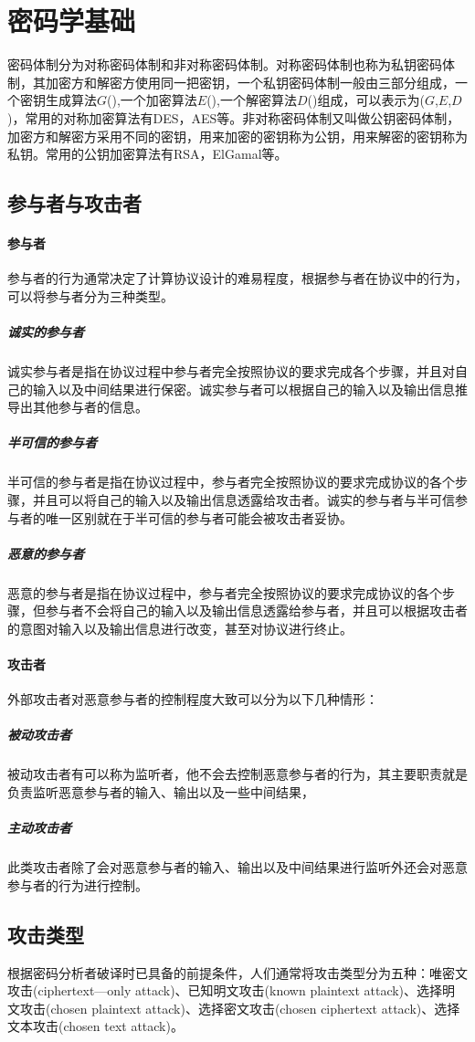 \section{密码学基础}
密码体制分为对称密码体制和非对称密码体制。对称密码体制也称为私钥密码体制，其加密方和解密方使用同一把密钥，一个私钥密码体制一般由三部分组成，一个密钥生成算法$G$(),一个加密算法$E$(),一个解密算法$D$()组成，可以表示为($G$,$E$,$D$)，常用的对称加密算法有DES，AES等。非对称密码体制又叫做公钥密码体制，加密方和解密方采用不同的密钥，用来加密的密钥称为公钥，用来解密的密钥称为私钥。常用的公钥加密算法有RSA，ElGamal等。
\subsection{参与者与攻击者}
\paragraph{参与者}
参与者的行为通常决定了计算协议设计的难易程度，根据参与者在协议中的行为，可以将参与者分为三种类型。

\subparagraph{诚实的参与者}诚实参与者是指在协议过程中参与者完全按照协议的要求完成各个步骤，并且对自己的输入以及中间结果进行保密。诚实参与者可以根据自己的输入以及输出信息推导出其他参与者的信息。

\subparagraph{半可信的参与者}半可信的参与者是指在协议过程中，参与者完全按照协议的要求完成协议的各个步骤，并且可以将自己的输入以及输出信息透露给攻击者。诚实的参与者与半可信参与者的唯一区别就在于半可信的参与者可能会被攻击者妥协。

\subparagraph{恶意的参与者}恶意的参与者是指在协议过程中，参与者完全按照协议的要求完成协议的各个步骤，但参与者不会将自己的输入以及输出信息透露给参与者，并且可以根据攻击者的意图对输入以及输出信息进行改变，甚至对协议进行终止。
\paragraph{攻击者}
外部攻击者对恶意参与者的控制程度大致可以分为以下几种情形：

\subparagraph{被动攻击者}被动攻击者有可以称为监听者，他不会去控制恶意参与者的行为，其主要职责就是负责监听恶意参与者的输入、输出以及一些中间结果，

\subparagraph{主动攻击者}此类攻击者除了会对恶意参与者的输入、输出以及中间结果进行监听外还会对恶意参与者的行为进行控制。

\subsection{攻击类型}
根据密码分析者破译时已具备的前提条件，人们通常将攻击类型分为五种：唯密文攻击(ciphertext—only attack)、已知明文攻击(known plaintext attack)、选择明文攻击(chosen plaintext attack)、选择密文攻击(chosen ciphertext attack)、选择文本攻击(chosen text attack)。
